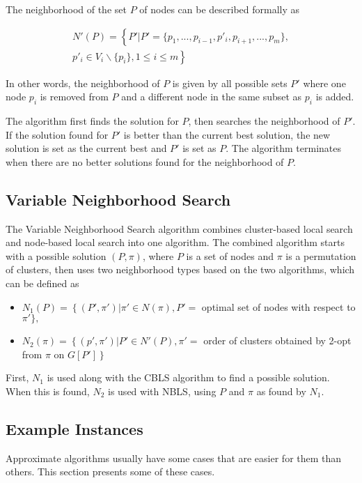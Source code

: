 \documentclass{sig-alternate}
\begin{document}
The neighborhood of the set $P$ of nodes can be described formally as

\begin{align*}
N'(P) = \left\{P' | P' = \{p_{1},...,p_{i-1},p'_{i},p_{i+1},...,p_{m}\},\right.
\\
\left. p'_{i} \in V_{i} \backslash \{p_{i}\},1 \leq i \leq m \right\}
\end{align*}

In other words, the neighborhood of $P$ is given by all possible sets $P'$ where one node $p_{i}$ is removed from $P$ and a different node in the same subset as $p_{i}$ is added. 

The algorithm first finds the solution for $P$, then searches the neighborhood of $P'$. If the solution found for $P'$ is better than the current best solution, the new solution is set as the current best and $P'$ is set as $P$. The algorithm terminates when there are no better solutions found for the neighborhood of $P$. 

\subsection{Variable Neighborhood Search}
\label{subs:VNS}
The Variable Neighborhood Search algorithm combines cluster-based local search and node-based local search into one algorithm. The combined algorithm starts with a possible solution $(P,\pi)$, where $P$ is a set of nodes and $\pi$ is a permutation of clusters, then uses two neighborhood types based on the two algorithms, which can be defined as
\begin{itemize}
\item $N_{1}(P) = \left\{(P',\pi') | \pi' \in N(\pi), P'= \right.$ optimal set of nodes with respect to $\left. \pi' \},\right.$
\item $N_{2}(\pi) = \left\{(p',\pi') | P' \in N'(P),\pi'=\right.$ order of clusters obtained by 2-opt from $\pi$ on $\left. G[P']\right\}$
\end{itemize}

First, $N_{1}$ is used along with the CBLS algorithm to find a possible solution. When this is found, $N_{2}$ is used with NBLS, using $P$ and $\pi$ as found by $N_{1}$. 

\subsection{Example Instances}
\label{subs:instances}
Approximate algorithms usually have some cases that are easier for them than others. This section presents some of these cases. 
\end{document}
